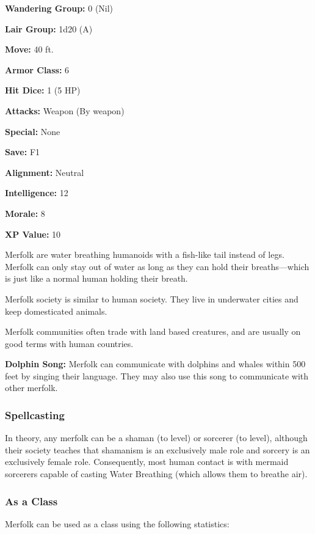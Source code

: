 \begin{multicols*}{2}
{{\textbf{Wandering Group:} 0 (Nil)

\textbf{Lair Group:} 1d20 (A)

\textbf{Move:} 40 ft.

\textbf{Armor Class:} 6

\textbf{Hit Dice:} 1 (5 HP)

\textbf{Attacks:} Weapon (By weapon)

\textbf{Special:} None

\textbf{Save:} F1

\textbf{Alignment:} Neutral

\textbf{Intelligence:} 12

\textbf{Morale:} 8

\textbf{XP Value:} 10}}

Merfolk are water breathing humanoids with a fish-like tail instead of legs. Merfolk can only stay out of water as long as they can hold their breaths—which is just like a normal human holding their breath.

Merfolk society is similar to human society. They live in underwater cities and keep domesticated animals.

Merfolk communities often trade with land based creatures, and are usually on good terms with human countries.

\textbf{Dolphin Song:} Merfolk can communicate with dolphins and whales within 500 feet by singing their language. They may also use this song to communicate with other merfolk.

\subsubsection{Spellcasting}
In theory, any merfolk can be a shaman (to  level) or sorcerer (to  level), although their society teaches that shamanism is an exclusively male role and sorcery is an exclusively female role. Consequently, most human contact is with mermaid sorcerers capable of casting Water Breathing (which allows them to breathe air).

\subsubsection{As a Class}
Merfolk can be used as a class using the following statistics:

\end{multicols*}
